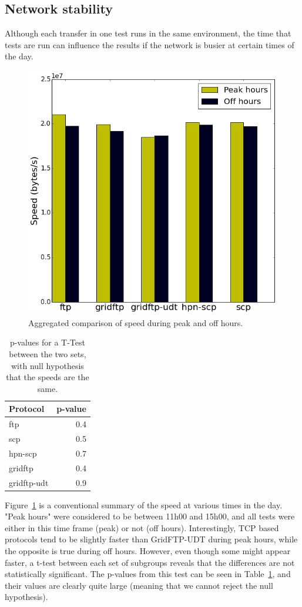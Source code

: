 \documentclass{sig-alternate-05-2015}
\begin{document}
\subsection{Network stability}
Although each transfer in one test runs in the same environment, the time that tests are run can influence the results if the network is busier at certain times of the day.

\begin{figure}
\centering
\includegraphics[width=.8\linewidth]{img/peak.png}
\caption{Aggregated comparison of speed during peak and off hours.}
\label{fig:peak}
\end{figure}

\begin{table}
\centering
	\begin{tabular}{lr}
	\toprule
	Protocol &  p-value \\
	\midrule
	ftp         &      0.4 \\
	scp         &      0.5 \\
	hpn-scp     &      0.7 \\
	gridftp     &      0.4 \\
	gridftp-udt &      0.9 \\
	\bottomrule
	\end{tabular}
\caption{p-values for a T-Test between the two sets, with null hypothesis that the speeds are the same.}
\label{tab:pval}
\end{table}

Figure~\ref{fig:peak} is a conventional summary of the speed at various times in the day. "Peak hours" were considered to be between 11h00 and 15h00, and all tests were either in this time frame (peak) or not (off hours). Interestingly, TCP based protocols tend to be slightly faster than GridFTP-UDT during peak hours, while the opposite is true during off hours. However, even though some might appear faster, a t-test between each set of subgroups reveals that the differences are not statistically significant. The p-values from this test can be seen in Table~\ref{tab:pval}, and their values are clearly quite large (meaning that we cannot reject the null hypothesis).
\end{document}
